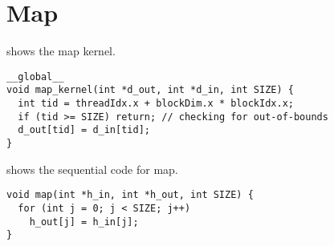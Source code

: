 \section{Map}
\label{sec:map}

 shows the map kernel.

\begin{lstlisting}[caption={Map kernel}, label={lst:map par}]
__global__ 
void map_kernel(int *d_out, int *d_in, int SIZE) {
  int tid = threadIdx.x + blockDim.x * blockIdx.x;
  if (tid >= SIZE) return; // checking for out-of-bounds
  d_out[tid] = d_in[tid];
}
\end{lstlisting}

 shows the sequential code for map.

\begin{lstlisting}[caption={Sequential map}, label={lst:map seq}]
void map(int *h_in, int *h_out, int SIZE) {
  for (int j = 0; j < SIZE; j++) 
    h_out[j] = h_in[j];
}
\end{lstlisting}

